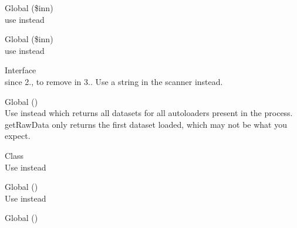 \begin{DoxyRefList}
\item[Global \doxylink{class_faker_1_1_calculator_1_1_inn_ac2c2403ad7e822e981c57ba9c1e0ff5d}{Inn\+::checksum} (\$inn)]\hfill \\
\label{deprecated__deprecated000053}%
%
use {\ttfamily \doxylink{}{()}} instead  
\item[Global \doxylink{class_faker_1_1_calculator_1_1_inn_ac769a9128170756ba3491801d579cd97}{Inn\+::is\+Valid} (\$inn)]\hfill \\
\label{deprecated__deprecated000054}%
%
use {\ttfamily \doxylink{}{()}} instead  
\item[Interface \doxylink{interface_masterminds_1_1_h_t_m_l5_1_1_parser_1_1_input_stream}{Input\+Stream} ]\hfill \\
\label{deprecated__deprecated000159}%
%
since 2., to remove in 3.. Use a string in the scanner instead.  
\item[Global \doxylink{class_composer_1_1_installed_versions_a6ecee8643c03c515b55686f03d117665}{Installed\+Versions\+::get\+Raw\+Data} ()]\hfill \\
\label{deprecated__deprecated000003}%
%
Use  instead which returns all datasets for all autoloaders present in the process. get\+Raw\+Data only returns the first dataset loaded, which may not be what you expect.  
\item[Class \doxylink{class_faker_1_1_provider_1_1zh___t_w_1_1_internet}{Internet} ]\hfill \\
\label{deprecated__deprecated000070}%
%
Use {\ttfamily {}} instead  
\item[Global \doxylink{class_faker_1_1_provider_1_1zh___t_w_1_1_internet_a15373742a8411f9b23873e27e64d2d5b}{Internet\+::domain\+Word} ()]\hfill \\
\label{deprecated__deprecated000072}%
%
Use {\ttfamily \doxylink{}{()}} instead  
\item[Global \doxylink{class_faker_1_1_provider_1_1zh___t_w_1_1_internet_ae08413c329b142d00f90d6c99b350755}{Internet\+::user\+Name} ()]\hfill \\
\label{deprecated__deprecated000071}%
%

\end{DoxyRefList}
